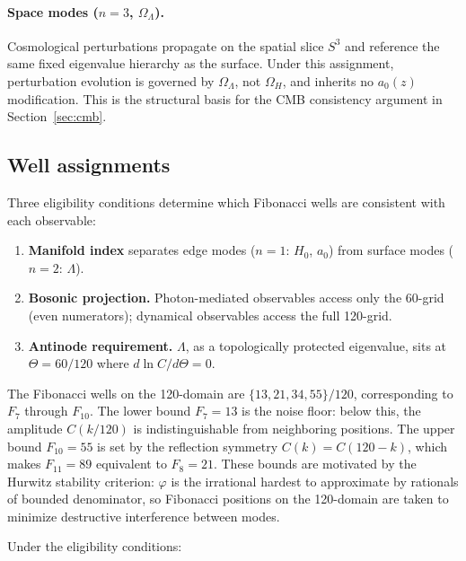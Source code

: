 \documentclass[11pt,a4paper]{article}
\numberwithin{equation}{section}
\numberwithin{table}{section}
\numberwithin{figure}{section}
\newcommand{\afid}{a_0}
\begin{document}
\paragraph{Space modes ($n = 3$, $\Omega_\Lambda$).}
Cosmological perturbations propagate on the spatial slice $S^3$ and
reference the same fixed eigenvalue hierarchy as the surface. Under
this assignment, perturbation evolution is governed by $\Omega_\Lambda$,
not $\Omega_H$, and inherits no $\afid(z)$ modification. This is the
structural basis for the CMB consistency argument in
Section~\ref{sec:cmb}.

\subsection{Well assignments}
\label{app:wells}

Three eligibility conditions determine which Fibonacci wells are
consistent with each observable:

\begin{enumerate}[label=\textbf{\arabic*.}, leftmargin=*]
\item \textbf{Manifold index} separates edge modes ($n = 1$: $H_0$,
$\afid$) from surface modes ($n = 2$: $\Lambda$).

\item \textbf{Bosonic projection.} Photon-mediated observables access
only the 60-grid (even numerators); dynamical observables access the
full 120-grid.

\item \textbf{Antinode requirement.} $\Lambda$, as a topologically
protected eigenvalue, sits at $\Theta = 60/120$ where
$d\ln C/d\Theta = 0$.
\end{enumerate}

The Fibonacci wells on the 120-domain are $\{13, 21, 34, 55\}/120$,
corresponding to $F_7$ through $F_{10}$. The lower bound $F_7 = 13$ is
the noise floor: below this, the amplitude $C(k/120)$ is
indistinguishable from neighboring positions. The upper bound
$F_{10} = 55$ is set by the reflection symmetry $C(k) = C(120 - k)$,
which makes $F_{11} = 89$ equivalent to $F_8 = 21$. These bounds are
motivated by the Hurwitz stability criterion: $\varphi$ is the
irrational hardest to approximate by rationals of bounded denominator,
so Fibonacci positions on the 120-domain are taken to minimize
destructive interference between modes.

Under the eligibility conditions:
\end{document}
